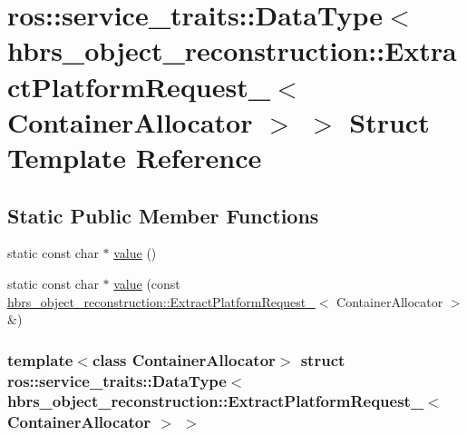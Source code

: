\hypertarget{structros_1_1service__traits_1_1_data_type_3_01hbrs__object__reconstruction_1_1_extract_platform3370078bee5a4b2391c6f2b9a1765e21}{\section{ros\-:\-:service\-\_\-traits\-:\-:\-Data\-Type$<$ hbrs\-\_\-object\-\_\-reconstruction\-:\-:\-Extract\-Platform\-Request\-\_\-$<$ \-Container\-Allocator $>$ $>$ \-Struct \-Template \-Reference}
\label{structros_1_1service__traits_1_1_data_type_3_01hbrs__object__reconstruction_1_1_extract_platform3370078bee5a4b2391c6f2b9a1765e21}
}
\subsection*{\-Static \-Public \-Member \-Functions}
\begin{DoxyCompactItemize}
\item 
static const char $\ast$ \hyperlink{structros_1_1service__traits_1_1_data_type_3_01hbrs__object__reconstruction_1_1_extract_platform3370078bee5a4b2391c6f2b9a1765e21_a5a19df1ead69226c5b377a6b48d33eb8}{value} ()
\item 
static const char $\ast$ \hyperlink{structros_1_1service__traits_1_1_data_type_3_01hbrs__object__reconstruction_1_1_extract_platform3370078bee5a4b2391c6f2b9a1765e21_a12222dc8677f5dc3f98043e3a25dba70}{value} (const \hyperlink{structhbrs__object__reconstruction_1_1_extract_platform_request__}{hbrs\-\_\-object\-\_\-reconstruction\-::\-Extract\-Platform\-Request\-\_\-}$<$ \-Container\-Allocator $>$ \&)
\end{DoxyCompactItemize}
\subsubsection*{template$<$class Container\-Allocator$>$ struct ros\-::service\-\_\-traits\-::\-Data\-Type$<$ hbrs\-\_\-object\-\_\-reconstruction\-::\-Extract\-Platform\-Request\-\_\-$<$ Container\-Allocator $>$ $>$}




